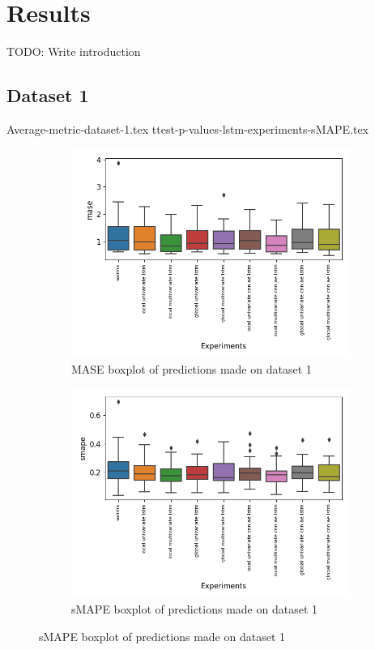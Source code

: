 \section{Results}
\label{section:discussion&results:experiment-results}
TODO: Write introduction
\subsection{Dataset 1}
{Average-metric-dataset-1.tex}
{ttest-p-values-lstm-experiments-sMAPE.tex}

\begin{figure}[h!]
  \centering
  \begin{subfigure}[b]{0.49\textwidth}
    \includegraphics[width=\textwidth]{./figs/results/boxplot/mase-dataset_1.png}
    \hfill
    \caption{MASE boxplot of predictions made on dataset 1}
    \label{fig:results:boxplot-mase-dataset-1-mase}
  \end{subfigure}
  \begin{subfigure}[b]{0.49\textwidth}
    \includegraphics[width=\textwidth]{./figs/results/boxplot/smape-dataset_1.png}
    \hfill
    \caption{sMAPE boxplot of predictions made on dataset 1}
    \label{fig:results:boxplot-mase-dataset-1-smape}


\end{subfigure}
\end{figure}
